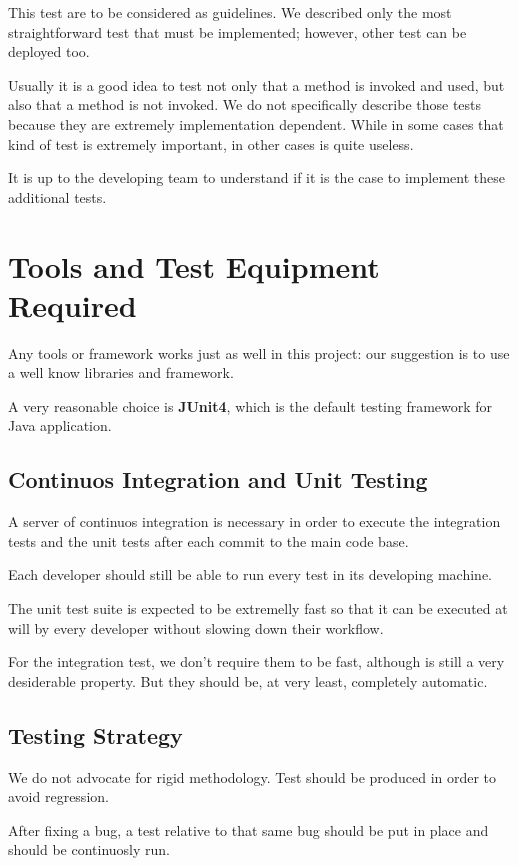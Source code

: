 \documentclass[11pt]{article} %
\begin{document}
This test are to be considered as guidelines. We described only the most straightforward test that must be implemented; however, other test can be deployed too.

Usually it is a good idea to test not only that a method is invoked and used, but also that a method is not invoked. We do not specifically describe those tests because they are extremely implementation dependent. While in some cases that kind of test is extremely important, in other cases is quite useless. 

It is up to the developing team to understand if it is the case to implement these additional tests.


\newpage
\section{Tools and Test Equipment Required}

Any tools or framework works just as well in this project: our suggestion is to use a well know libraries and framework.

A very reasonable choice is \textbf{JUnit4}, which is the default testing framework for Java application.

\subsection{Continuos Integration and Unit Testing}

A server of continuos integration is necessary in order to execute the integration tests and the unit tests after each commit to the main code base.

Each developer should still be able to run every test in its developing machine.

The unit test suite is expected to be extremelly fast so that it can be executed at will by every developer without slowing down their workflow.

For the integration test, we don't require them to be fast, although is still a very desiderable property. But they should be, at very least, completely automatic.

\subsection{Testing Strategy}

We do not advocate for rigid methodology. Test should be produced in order to avoid regression. 

After fixing a bug, a test relative to that same bug should be put in place and should be continuosly run.
\end{document}
